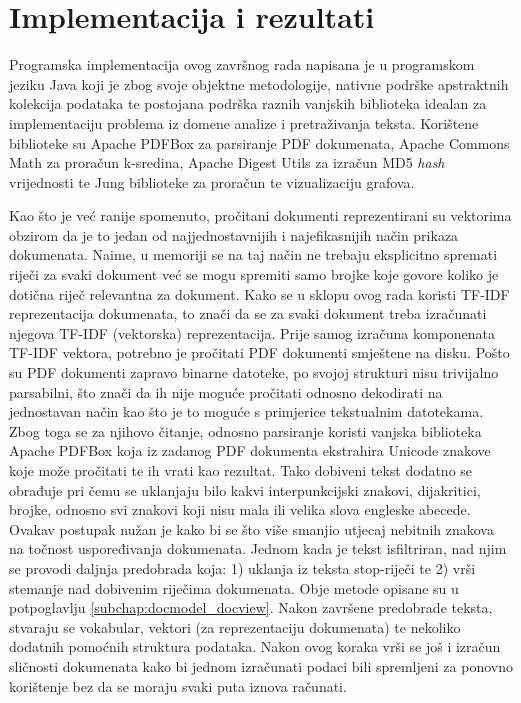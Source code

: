 \documentclass[times, utf8, zavrsni]{fer}
\begin{document}
\chapter{Implementacija i rezultati}
\label{chap:impl}
Programska implementacija ovog završnog rada napisana je u programskom jeziku Java koji je zbog svoje objektne metodologije, nativne podrške apstraktnih kolekcija podataka te postojana podrška raznih vanjskih biblioteka idealan za implementaciju problema iz domene analize i pretraživanja teksta.
Korištene biblioteke su Apache PDFBox za parsiranje PDF dokumenata, Apache Commons Math za proračun k-sredina, Apache Digest Utils za izračun MD5 \textit{hash} vrijednosti te Jung biblioteke za proračun te vizualizaciju grafova. \par
Kao što je već ranije spomenuto, pročitani dokumenti reprezentirani su vektorima obzirom da je to jedan od  najjednostavnijih i najefikasnijih način prikaza dokumenata. Naime, u memoriji se na taj način ne trebaju eksplicitno spremati riječi za svaki dokument već se mogu spremiti samo brojke koje govore koliko je dotična riječ relevantna za dokument. Kako se u sklopu ovog rada koristi TF-IDF reprezentacija dokumenata, to znači da se za svaki dokument treba izračunati njegova TF-IDF (vektorska) reprezentacija. Prije samog izračuna komponenata TF-IDF vektora, potrebno je pročitati PDF dokumenti smještene na disku. Pošto su PDF dokumenti zapravo binarne datoteke, po svojoj strukturi nisu trivijalno parsabilni, što znači da ih nije moguće pročitati odnosno dekodirati na jednostavan način kao što je to moguće s primjerice tekstualnim datotekama. Zbog toga se za njihovo čitanje, odnosno parsiranje koristi vanjska biblioteka Apache PDFBox koja iz zadanog PDF dokumenta ekstrahira Unicode znakove koje može pročitati te ih vrati kao rezultat. Tako dobiveni tekst dodatno se obrađuje pri čemu se uklanjaju bilo kakvi interpunkcijski znakovi, dijakritici, brojke, odnosno svi znakovi koji nisu mala ili velika slova engleske abecede. Ovakav postupak nužan je kako bi se što više smanjio utjecaj nebitnih znakova na točnost uspoređivanja dokumenata.
Jednom kada je tekst isfiltriran, nad njim se provodi daljnja predobrada koja: 1) uklanja iz teksta stop-riječi te 2) vrši stemanje nad dobivenim riječima dokumenata. Obje metode opisane su u potpoglavlju
\ref{subchap:docmodel_docview}. Nakon završene predobrade teksta, stvaraju se vokabular, vektori (za reprezentaciju dokumenata) te nekoliko dodatnih pomoćnih struktura podataka. Nakon ovog koraka vrši se još i izračun sličnosti dokumenata kako bi jednom izračunati podaci bili spremljeni za ponovno korištenje bez da se moraju svaki puta iznova računati.
\end{document}
